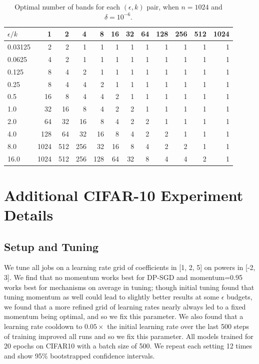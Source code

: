 \documentclass{article}
\begin{document}
\begin{table}
\centering
\begin{tabular}{l|rrrrrrrrrrr}
\toprule
$\epsilon / k$ &  1    &  2    &  4    &  8    &  16   &  32   &  64   &  128  &  256  &  512  &  1024 \\
\midrule
0.03125  &     2 &     2 &     1 &     1 &     1 &     1 &     1 &     1 &     1 &     1 &     1 \\
0.0625  &     4 &     2 &     1 &     1 &     1 &     1 &     1 &     1 &     1 &     1 &     1 \\
0.125  &     8 &     4 &     2 &     1 &     1 &     1 &     1 &     1 &     1 &     1 &     1 \\
0.25  &     8 &     4 &     4 &     2 &     1 &     1 &     1 &     1 &     1 &     1 &     1 \\
0.5  &    16 &     8 &     4 &     4 &     2 &     1 &     1 &     1 &     1 &     1 &     1 \\
1.0  &    32 &    16 &     8 &     4 &     2 &     2 &     1 &     1 &     1 &     1 &     1 \\
2.0  &    64 &    32 &    16 &     8 &     4 &     2 &     2 &     1 &     1 &     1 &     1 \\
4.0  &   128 &    64 &    32 &    16 &     8 &     4 &     2 &     2 &     1 &     1 &     1 \\
8.0  &  1024 &   512 &   256 &    32 &    16 &     8 &     4 &     2 &     2 &     1 &     1 \\
16.0 &  1024 &   512 &   256 &   128 &    64 &    32 &     8 &     4 &     4 &     2 &     1 \\
\bottomrule
\end{tabular}
\caption{\label{table:optbands} Optimal number of bands for each $(\epsilon, k)$ pair, when $n=1024$ and $\delta = 10^{-6}$.}
\end{table}

\section{Additional CIFAR-10 Experiment Details}\label{sec:cifar-detail}

\subsection{Setup and Tuning}\label{sec:cifar-tuning}
We tune all jobs on a learning rate grid of coefficients in [1, 2, 5] on powers in [-2, 3].
We find that no momentum works best for DP-SGD and momentum=0.95 works best for \mfftrl mechanisms on average in tuning; though initial tuning found that tuning momentum as well could lead to slightly better results at some $\epsilon$ budgets, we found that a more refined grid of learning rates nearly always led to a fixed momentum being optimal, and so we fix this parameter. We also found that a learning rate cooldown to $0.05\times$ the initial learning rate over the last 500 steps of training improved all runs and so we fix this parameter.
All models trained for 20 epochs on CIFAR10 with a batch size of 500. We repeat each setting 12 times and show 95\% bootstrapped confidence intervals. 
\end{document}
